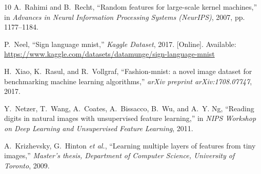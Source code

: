 \documentclass[journal]{IEEEtran}
\begin{document}
\begin{thebibliography}{10}
A.~Rahimi and B.~Recht, ``Random features for large-scale kernel machines,'' in \emph{Advances in Neural Information Processing Systems (NeurIPS)}, 2007, pp. 1177--1184.

P.~Neel, ``Sign language mnist,'' \emph{Kaggle Dataset}, 2017. [Online]. Available: \url{https://www.kaggle.com/datasets/datamunge/sign-language-mnist}

H.~Xiao, K.~Rasul, and R.~Vollgraf, ``Fashion-mnist: a novel image dataset for benchmarking machine learning algorithms,'' \emph{arXiv preprint arXiv:1708.07747}, 2017.

Y.~Netzer, T.~Wang, A.~Coates, A.~Bissacco, B.~Wu, and A.~Y. Ng, ``Reading digits in natural images with unsupervised feature learning,'' in \emph{NIPS Workshop on Deep Learning and Unsupervised Feature Learning}, 2011.

A.~Krizhevsky, G.~Hinton \emph{et al.}, ``Learning multiple layers of features from tiny images,'' \emph{Master's thesis, Department of Computer Science, University of Toronto}, 2009.

\end{thebibliography}
\end{document}
